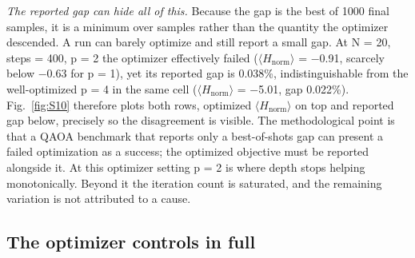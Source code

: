 \documentclass[journal]{IEEEtran}
\begin{document}
\textit{The reported gap can hide all of this.} Because the gap is the best of 1000 final samples, it is a minimum over samples rather than the quantity the optimizer descended. A run can barely optimize and still report a small gap. At N = 20, steps = 400, p = 2 the optimizer effectively failed ($\langle$$H_{\mathrm{norm}}$$\rangle$ = $-$0.91, scarcely below $-$0.63 for p = 1), yet its reported gap is 0.038\%, indistinguishable from the well-optimized p = 4 in the same cell ($\langle$$H_{\mathrm{norm}}$$\rangle$ = $-$5.01, gap 0.022\%). Fig.~\ref{fig:S10} therefore plots both rows, optimized $\langle$$H_{\mathrm{norm}}$$\rangle$ on top and reported gap below, precisely so the disagreement is visible. The methodological point is that a QAOA benchmark that reports only a best-of-shots gap can present a failed optimization as a success; the optimized objective must be reported alongside it. At this optimizer setting p = 2 is where depth stops helping monotonically. Beyond it the iteration count is saturated, and the remaining variation is not attributed to a cause.


\subsection{The optimizer controls in full}
\end{document}
